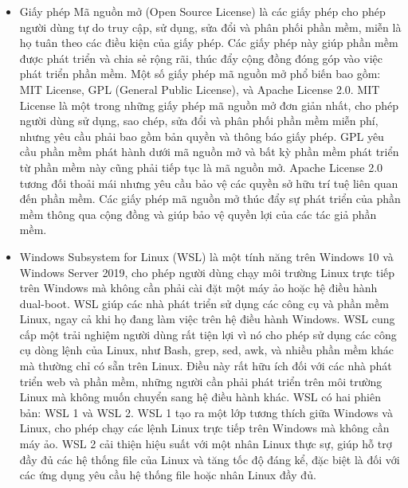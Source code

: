 \begin{itemize}
    \item Giấy phép Mã nguồn mở (Open Source License) là các giấy phép cho phép người dùng tự do truy cập, sử dụng, sửa đổi và phân phối phần mềm, miễn là họ tuân theo các điều kiện của giấy phép. Các giấy phép này giúp phần mềm được phát triển và chia sẻ rộng rãi, thúc đẩy cộng đồng đóng góp vào việc phát triển phần mềm. Một số giấy phép mã nguồn mở phổ biến bao gồm: MIT License, GPL (General Public License), và Apache License 2.0. MIT License là một trong những giấy phép mã nguồn mở đơn giản nhất, cho phép người dùng sử dụng, sao chép, sửa đổi và phân phối phần mềm miễn phí, nhưng yêu cầu phải bao gồm bản quyền và thông báo giấy phép. GPL yêu cầu phần mềm phát hành dưới mã nguồn mở và bất kỳ phần mềm phát triển từ phần mềm này cũng phải tiếp tục là mã nguồn mở. Apache License 2.0 tương đối thoải mái nhưng yêu cầu bảo vệ các quyền sở hữu trí tuệ liên quan đến phần mềm. Các giấy phép mã nguồn mở thúc đẩy sự phát triển của phần mềm thông qua cộng đồng và giúp bảo vệ quyền lợi của các tác giả phần mềm.
\end{itemize}

\begin{itemize}
    \item Windows Subsystem for Linux (WSL) là một tính năng trên Windows 10 và Windows Server 2019, cho phép người dùng chạy môi trường Linux trực tiếp trên Windows mà không cần phải cài đặt một máy ảo hoặc hệ điều hành dual-boot. WSL giúp các nhà phát triển sử dụng các công cụ và phần mềm Linux, ngay cả khi họ đang làm việc trên hệ điều hành Windows. WSL cung cấp một trải nghiệm người dùng rất tiện lợi vì nó cho phép sử dụng các công cụ dòng lệnh của Linux, như Bash, grep, sed, awk, và nhiều phần mềm khác mà thường chỉ có sẵn trên Linux. Điều này rất hữu ích đối với các nhà phát triển web và phần mềm, những người cần phải phát triển trên môi trường Linux mà không muốn chuyển sang hệ điều hành khác. WSL có hai phiên bản: WSL 1 và WSL 2. WSL 1 tạo ra một lớp tương thích giữa Windows và Linux, cho phép chạy các lệnh Linux trực tiếp trên Windows mà không cần máy ảo. WSL 2 cải thiện hiệu suất với một nhân Linux thực sự, giúp hỗ trợ đầy đủ các hệ thống file của Linux và tăng tốc độ đáng kể, đặc biệt là đối với các ứng dụng yêu cầu hệ thống file hoặc nhân Linux đầy đủ. 
\end{itemize}

